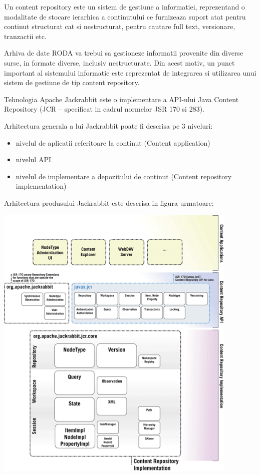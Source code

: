 
Un content repository este un sistem de gestiune a informatiei, reprezentand o modalitate de stocare ierarhica a continutului ce furnizeaza suport atat pentru continut structurat cat si nestructurat, pentru cautare full text, versionare, tranzactii etc.


\bigskip

Arhiva de date RODA va trebui sa gestioneze informatii provenite din diverse surse, in formate diverse, inclusiv nestructurate. Din acest motiv, un punct important al sistemului informatic este reprezentat de integrarea si utilizarea unui sistem de gestiune de tip content repository. 


\bigskip

Tehnologia Apache Jackrabbit este o implementare a API-ului Java Content Repository (JCR -- specificat in cadrul normelor JSR 170 si 283).


\bigskip

Arhitectura generala a lui Jackrabbit poate fi descrisa pe 3 niveluri:

\begin{itemize}
\item nivelul de aplicatii referitoare la continut (Content application)
\item nivelul API
\item nivelul de implementare a depozitului de continut (Content repository implementation)
\end{itemize}

\bigskip

Arhitectura produsului Jackrabbit este descrisa in figura urmatoare:

\bigskip

\begin{center}
\includegraphics[width=4.5866in,height=5.3299in]{jackrabbit-img/jackrabbit-img001.png}
\end{center}

